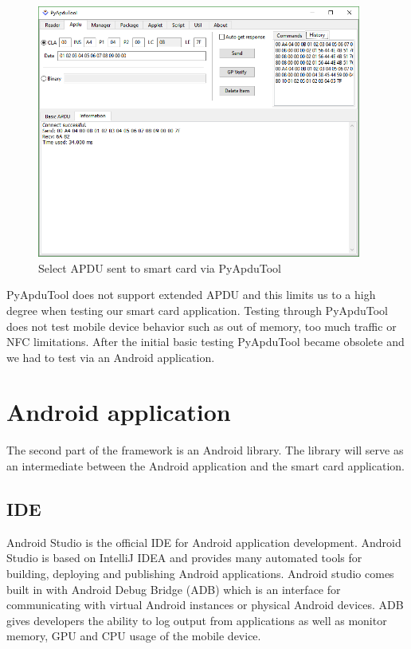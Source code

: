\begin{figure}[h!]
  \caption{Select APDU sent to smart card via PyApduTool}
  \label{fig:pyapdutool}
  \centering
    \includegraphics[width=0.95\textwidth]{images/pyapdutool.png}
\end{figure}

PyApduTool does not support extended APDU and this limits us to a high degree when testing our smart card application. Testing through PyApduTool does not test mobile device behavior such as out of memory, too much traffic or NFC limitations. After the initial basic testing PyApduTool became obsolete and we had to test via an Android application.


\section{Android application}
The second part of the framework is an Android library. The library will serve as an intermediate between the Android application and the smart card application.

\subsection{IDE}
Android Studio \cite{androidIDE} is the official IDE for Android application development. Android Studio is based on IntelliJ IDEA \cite{intelliJIDEA} and provides many automated tools for building, deploying and publishing Android applications. Android studio comes built in with Android Debug Bridge (ADB) which is an interface for communicating with virtual Android instances or physical Android devices. ADB gives developers the ability to log output from applications as well as monitor memory, GPU and CPU usage of the mobile device.

